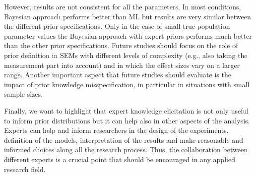 \documentclass[graybox]{svmult}
\begin{document}
However, results are not consistent for all the parameters. In most conditions, Bayesian approach performs better than ML but results are very similar between the different prior specifications. Only in the case of small true population parameter values the Bayesian approach with expert priors performs much better than the other prior specifications.
Future studies should focus on the role of prior definition in SEMs with different levels of complexity (e.g., also taking the measurement part into account) and in which the effect sizes vary on a larger range. Another important aspect that future studies should evaluate is the impact of prior knowledge misspecification, in particular in situations with small sample sizes.


Finally, we want to highlight that expert knowledge elicitation is not only useful to inform prior distributions but it can help also in other aspects of the analysis. Experts can help and inform researchers in the design of the experiments, definition of the models, interpretation of the results and make reasonable and informed choices along all the research process. Thus, the collaboration between different experts is a crucial point that should be encouraged in any applied research field.





%
\end{document}
